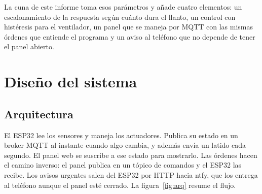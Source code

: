 La cuna de este informe toma esos parámetros y añade cuatro elementos: un
escalonamiento de la respuesta según cuánto dura el llanto, un control con histéresis
para el ventilador, un panel que se maneja por MQTT con las mismas órdenes que
entiende el programa y un aviso al teléfono que no depende de tener el panel abierto.

\section{Diseño del sistema}

\subsection{Arquitectura}

El ESP32 lee los sensores y maneja los actuadores. Publica su estado en un broker MQTT
al instante cuando algo cambia, y además envía un latido cada segundo. El panel web se
suscribe a ese estado para mostrarlo. Las órdenes hacen el camino inverso: el panel
publica en un tópico de comandos y el ESP32 las recibe. Los avisos urgentes salen del
ESP32 por HTTP hacia ntfy, que los entrega al teléfono aunque el panel esté cerrado. La
figura~\ref{fig:arq} resume el flujo.

